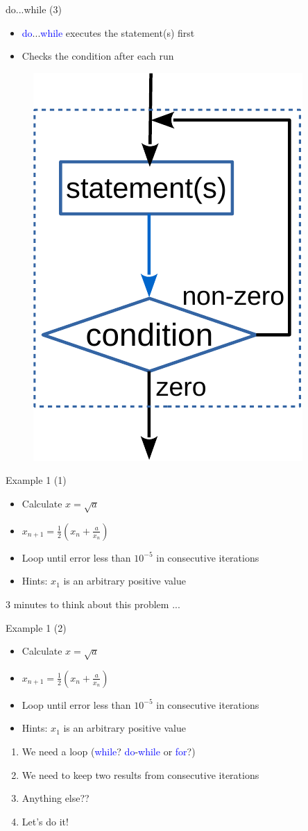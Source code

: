 \begin{frame}[fragile]{do...while (3)}
\begin{itemize}
	\item {\textcolor{blue}{do}...\textcolor{blue}{while} executes the statement(s) first}
	\item {Checks the condition after each run}
\end{itemize}	
\begin{figure}
	\includegraphics[width=0.30\linewidth]{figs/dowhile.pdf}
\end{figure}
\end{frame}


\begin{frame}[fragile]{Example 1 (1)}
\begin{itemize}
	\item {Calculate $x=\sqrt{a}$}
	\item {$x_{n+1}=\frac{1}{2}(x_n+\frac{a}{x_n})$}
	\item {Loop until error less than $10^{-5}$ in consecutive iterations}
	\item {Hints: $x_1$ is an arbitrary positive value}
\end{itemize}

\begin{center}
	\Large{3 minutes to think about this problem ...}
\end{center}

\end{frame}

\begin{frame}[fragile]{Example 1 (2)}
\begin{itemize}
	\item {Calculate $x=\sqrt{a}$}
	\item {$x_{n+1}=\frac{1}{2}(x_n+\frac{a}{x_n})$}
	\item {Loop until error less than $10^{-5}$ in consecutive iterations}
	\item {Hints: $x_1$ is an arbitrary positive value}
\end{itemize}

\begin{enumerate}
	\item {We need a loop (\textcolor{blue}{while}? \textcolor{blue}{do}-\textcolor{blue}{while} or \textcolor{blue}{for}?)}
	\item {We need to keep two results from consecutive iterations}
	\item {Anything else??}
	\item {Let's do it!}
\end{enumerate}

\end{frame}

